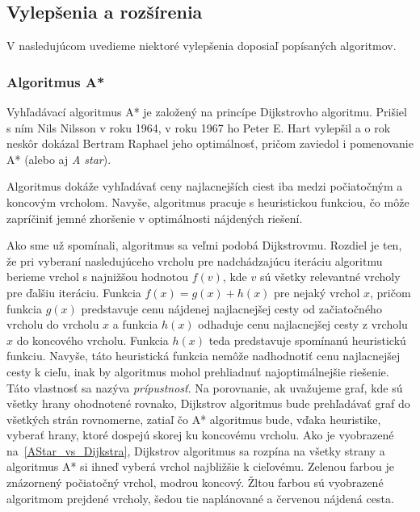 \subsection{Vylepšenia a rozšírenia}

V nasledujúcom uvedieme niektoré vylepšenia doposiaľ popísaných algoritmov.


\subsubsection{Algoritmus A*}

Vyhľadávací algoritmus A* je založený na princípe Dijkstrovho algoritmu. Prišiel s ním Nils Nilsson v roku 1964, v roku 1967 ho Peter E. Hart vylepšil a o rok neskôr dokázal Bertram Raphael jeho optimálnosť, pričom zaviedol i pomenovanie A* (alebo aj \textit{A star}).\newline

Algoritmus dokáže vyhľadávať ceny najlacnejších ciest iba medzi počiatočným a koncovým vrcholom. Navyše, algoritmus pracuje s heuristickou funkciou, čo môže zapríčiniť jemné zhoršenie v optimálnosti nájdených riešení.\newline

Ako sme už spomínali, algoritmus sa veľmi podobá Dijkstrovmu. Rozdiel je ten, že pri vyberaní nasledujúceho vrcholu pre nadchádzajúcu iteráciu algoritmu berieme vrchol s najnižšou hodnotou $f(v)$, kde $v$ sú všetky relevantné vrcholy pre ďalšiu iteráciu. Funkcia $f(x) = g(x) + h(x)$ pre nejaký vrchol $x$, pričom funkcia $g(x)$ predstavuje cenu nájdenej najlacnejšej cesty od začiatočného vrcholu do vrcholu $x$ a funkcia $h(x)$ odhaduje cenu najlacnejšej cesty z vrcholu $x$ do koncového vrcholu. Funkcia $h(x)$ teda predstavuje spomínanú heuristickú funkciu. Navyše, táto heuristická funkcia nemôže nadhodnotiť cenu najlacnejšej cesty k cieľu, inak by algoritmus mohol prehliadnuť najoptimálnejšie riešenie. Táto vlastnosť sa nazýva \textit{prípustnosť}. Na porovnanie, ak uvažujeme graf, kde sú všetky hrany ohodnotené rovnako, Dijkstrov algoritmus bude prehľadávať graf do všetkých strán rovnomerne, zatiaľ čo A* algoritmus bude, vďaka heuristike, vyberať hrany, ktoré dospejú skorej ku koncovému vrcholu. Ako je vyobrazené na~\ref{AStar_vs_Dijkstra}, Dijkstrov algoritmus sa rozpína na všetky strany a algoritmus A* si ihneď vyberá vrchol najbližšie k cieľovému. Zelenou farbou je znázornený počiatočný vrchol, modrou koncový. Žltou farbou sú vyobrazené algoritmom prejdené vrcholy, šedou tie naplánované a červenou nájdená cesta.\newline

